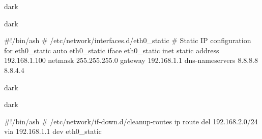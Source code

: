 \begin{baseBoxThree}{}{dark}
    \smallskip
    \label{/etc/network/interfaces.d}
    \begin{baseBoxThree}{}{dark}
        \begin{posnex}
#!/bin/ash
# /etc/network/interfaces.d/eth0_static
# Static IP configuration for eth0_static
auto eth0_static
iface eth0_static inet static
    address 192.168.1.100
    netmask 255.255.255.0
    gateway 192.168.1.1
    dns-nameservers 8.8.8.8 8.8.4.4
        \end{posnex}
    \end{baseBoxThree}
    \smallskip
    \label{/etc/network/if-pre-down.d}
    \begin{baseBoxThree}{}{dark}
    \end{baseBoxThree}
    \smallskip
    \label{/etc/network/if-down.d}
    \begin{baseBoxThree}{}{dark}
        \begin{posnex}
#!/bin/ash
# /etc/network/if-down.d/cleanup-routes
ip route del 192.168.2.0/24 via 192.168.1.1 dev eth0_static
        \end{posnex}
    \end{baseBoxThree}
    \smallskip
\end{baseBoxThree}

